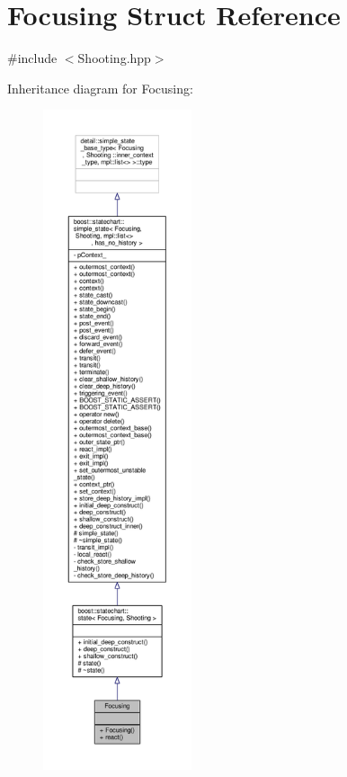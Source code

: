 \hypertarget{struct_focusing}{}\section{Focusing Struct Reference}
\label{struct_focusing}


{\ttfamily \#include $<$Shooting.\+hpp$>$}



Inheritance diagram for Focusing\+:
\nopagebreak
\begin{figure}[H]
\begin{center}
\leavevmode
\includegraphics[height=550pt]{struct_focusing__inherit__graph}
\end{center}
\end{figure}


